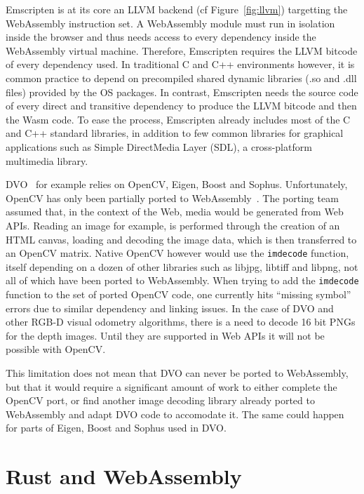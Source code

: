 Emscripten is at its core an LLVM backend (cf Figure~\ref{fig:llvm})
targetting the WebAssembly instruction set.
A WebAssembly module must run in isolation inside the browser
and thus needs access to every dependency inside the WebAssembly virtual machine.
Therefore, Emscripten requires the LLVM bitcode of every dependency used.
In traditional C and C++ environments however,
it is common practice to depend on precompiled
shared dynamic libraries (.so and .dll files) provided by the OS packages.
In contrast, Emscripten needs the source code of every direct
and transitive dependency to produce the LLVM bitcode and then the Wasm code.
To ease the process, Emscripten already includes most of the C and C++ standard libraries,
in addition to few common libraries for graphical applications such as
Simple DirectMedia Layer (SDL), a cross-platform multimedia library.

DVO~\cite{steinbrucker2011real} for example relies on OpenCV, Eigen, Boost and Sophus.
Unfortunately, OpenCV has only been partially ported to WebAssembly~\cite{taheri2018opencv}.
The porting team assumed that, in the context of the Web,
media would be generated from Web APIs.
Reading an image for example, is performed through the creation of an HTML canvas,
loading and decoding the image data, which is then transferred to an OpenCV matrix.
Native OpenCV however would use the \verb|imdecode| function,
itself depending on a dozen of other libraries such as libjpg, libtiff and libpng,
not all of which have been ported to WebAssembly.
When trying to add the \verb|imdecode| function to the set of ported OpenCV code,
one currently hits ``missing symbol'' errors due to similar dependency and linking issues.
In the case of DVO and other RGB-D visual odometry algorithms,
there is a need to decode 16 bit PNGs for the depth images.
Until they are supported in Web APIs it will not be possible with OpenCV.

This limitation does not mean that DVO can never be ported to WebAssembly,
but that it would require a significant amount of work to either
complete the OpenCV port, or find another image decoding library
already ported to WebAssembly and adapt DVO code to accomodate it.
The same could happen for parts of Eigen, Boost and Sophus used in DVO.

\section{Rust and WebAssembly}%
\label{sec:rust_wasm}

